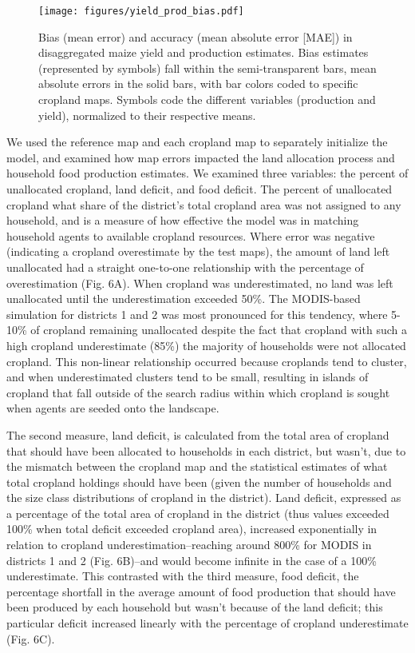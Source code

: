 \documentclass{pnastwo}
\begin{document}
\begin{article}
\begin{figure}[!hb]
\centerline{\texttt{[image: figures/yield\_prod\_bias.pdf]}}
\caption{Bias (mean error) and accuracy (mean absolute error [MAE]) in disaggregated maize yield and production estimates. Bias estimates (represented by symbols) fall within the semi-transparent bars, mean absolute errors in the solid bars, with bar colors coded to specific cropland maps.  Symbols code the different variables (production and yield), normalized to their respective means.}
\label{afoto}
\end{figure}

We used the reference map and each cropland map to separately initialize the model, and examined how map errors impacted the land allocation process and household food production estimates. We examined three variables: the percent of unallocated cropland, land deficit, and food deficit. The percent of unallocated cropland what share of the district's total cropland area was not assigned to any household, and is a measure of how effective the model was in matching household agents to available cropland resources. Where error was negative (indicating a cropland overestimate by the test maps), the amount of land left unallocated had a straight one-to-one relationship with the percentage of overestimation (Fig. 6A). When cropland was underestimated, no land was left unallocated until the underestimation exceeded 50\%. The MODIS-based simulation for districts 1 and 2 was most pronounced for this tendency, where 5-10\% of cropland remaining unallocated despite the fact that cropland with such a high cropland underestimate (85\%) the majority of households were not allocated cropland. This non-linear relationship occurred because croplands tend to cluster, and when underestimated clusters tend to be small, resulting in islands of cropland that fall outside of the search radius within which cropland is sought when agents are seeded onto the landscape. 

The second measure, land deficit, is calculated from the total area of cropland that should have been allocated to households in each district, but wasn't, due to the mismatch between the cropland map and the statistical estimates of what total cropland holdings should have been (given the number of households and the size class distributions of cropland in the district). Land deficit, expressed as a percentage of the total area of cropland in the district (thus values exceeded 100\% when total deficit exceeded cropland area),  increased exponentially in relation to cropland underestimation--reaching around 800\% for MODIS in districts 1 and 2 (Fig. 6B)--and would become infinite in the case of a 100\% underestimate. This contrasted with the third measure, food deficit, the percentage shortfall in the average amount of food production that should have been produced by each household but wasn't because of the land deficit; this particular deficit increased linearly with the percentage of cropland underestimate (Fig. 6C). 


\end{article}
\end{document}
